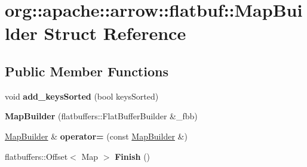 \hypertarget{structorg_1_1apache_1_1arrow_1_1flatbuf_1_1MapBuilder}{}\section{org\+:\+:apache\+:\+:arrow\+:\+:flatbuf\+:\+:Map\+Builder Struct Reference}
\label{structorg_1_1apache_1_1arrow_1_1flatbuf_1_1MapBuilder}
\subsection*{Public Member Functions}
\begin{DoxyCompactItemize}
\item 
void {\bfseries add\+\_\+keys\+Sorted} (bool keys\+Sorted)\hypertarget{structorg_1_1apache_1_1arrow_1_1flatbuf_1_1MapBuilder_ac28a5d62f6fb2b193072d7642c5adbc6}{}\label{structorg_1_1apache_1_1arrow_1_1flatbuf_1_1MapBuilder_ac28a5d62f6fb2b193072d7642c5adbc6}

\item 
{\bfseries Map\+Builder} (flatbuffers\+::\+Flat\+Buffer\+Builder \&\+\_\+fbb)\hypertarget{structorg_1_1apache_1_1arrow_1_1flatbuf_1_1MapBuilder_ad36d8caac942ac01e0abb794d2466c6f}{}\label{structorg_1_1apache_1_1arrow_1_1flatbuf_1_1MapBuilder_ad36d8caac942ac01e0abb794d2466c6f}

\item 
\hyperlink{structorg_1_1apache_1_1arrow_1_1flatbuf_1_1MapBuilder}{Map\+Builder} \& {\bfseries operator=} (const \hyperlink{structorg_1_1apache_1_1arrow_1_1flatbuf_1_1MapBuilder}{Map\+Builder} \&)\hypertarget{structorg_1_1apache_1_1arrow_1_1flatbuf_1_1MapBuilder_ac26a96040ddfabb02d24bb1f270afada}{}\label{structorg_1_1apache_1_1arrow_1_1flatbuf_1_1MapBuilder_ac26a96040ddfabb02d24bb1f270afada}

\item 
flatbuffers\+::\+Offset$<$ Map $>$ {\bfseries Finish} ()\hypertarget{structorg_1_1apache_1_1arrow_1_1flatbuf_1_1MapBuilder_af88c2a9d030a3510e7e5dc4de7abe3ae}{}\label{structorg_1_1apache_1_1arrow_1_1flatbuf_1_1MapBuilder_af88c2a9d030a3510e7e5dc4de7abe3ae}

\end{DoxyCompactItemize}

